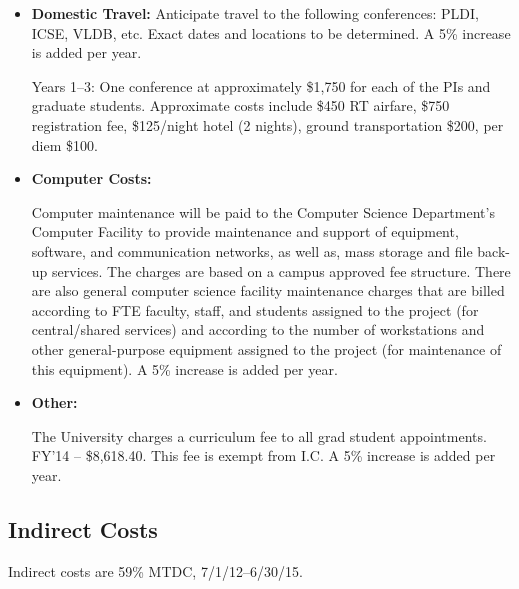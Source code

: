 \begin{itemize}
\item \textbf{Domestic Travel:} Anticipate travel to the following
  conferences: PLDI, ICSE, VLDB, etc. Exact dates and locations to
  be determined.  A 5\% increase is added per year.
 
  Years 1--3: One conference at approximately \$1,750 for each of the PIs and
graduate students. Approximate
costs include \$450 RT airfare, \$750 registration fee, \$125/night hotel (2 nights),
ground transportation \$200, per diem \$100.


 
\clearpage
\thispagestyle{empty}



\item \textbf{Computer Costs:}

  Computer maintenance will be paid to the Computer Science Department's Computer Facility to provide maintenance and support of equipment, software, and communication networks, as well as, mass storage and file back-up services. The charges are based on a campus approved fee structure.  There are also general computer science facility maintenance charges that are billed according to FTE faculty, staff, and students assigned to the project (for central/shared services) and according to the number of workstations and other general-purpose equipment assigned to the project (for maintenance of this equipment).  A 5\% increase is added per year.

\item \textbf{Other:}

  The University charges a curriculum fee to all grad student
  appointments.  FY’14 -- \$8,618.40. 
  This fee is exempt from I.C.  A 5\%
  increase is added per year.

\end{itemize}

\subsection*{Indirect Costs}

Indirect costs are 59\% MTDC, 7/1/12--6/30/15.


\clearpage
